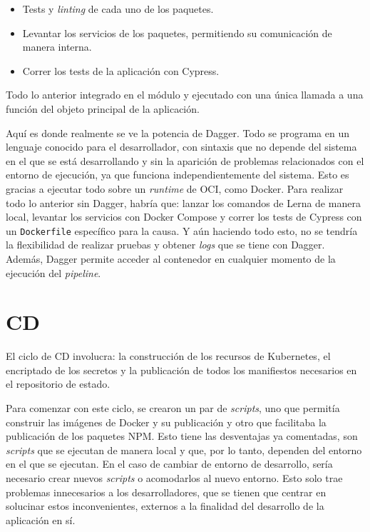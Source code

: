 \begin{itemize}
  \item Tests y \textit{linting} de cada uno de los paquetes.
  \item Levantar los servicios de los paquetes, permitiendo su comunicación de manera interna.
  \item Correr los tests de la aplicación con Cypress.
\end{itemize}

Todo lo anterior integrado en el módulo y ejecutado con una única llamada a una función del objeto principal de la aplicación.

Aquí es donde realmente se ve la potencia de Dagger. Todo se programa en un lenguaje conocido para el desarrollador, con sintaxis que no depende del sistema en el que se está desarrollando y sin la aparición de problemas relacionados con el entorno de ejecución, ya que funciona independientemente del sistema. Esto es gracias a ejecutar todo sobre un \textit{runtime} de OCI, como Docker. Para realizar todo lo anterior sin Dagger, habría que: lanzar los comandos de Lerna de manera local, levantar los servicios con Docker Compose y correr los tests de Cypress con un \texttt{Dockerfile} específico para la causa. Y aún haciendo todo esto, no se tendría la flexibilidad de realizar pruebas y obtener \textit{logs} que se tiene con Dagger. Además, Dagger permite acceder al contenedor en cualquier momento de la ejecución del \textit{pipeline}.

\section{CD}
\label{sec:cd}

El ciclo de CD involucra: la construcción de los recursos de Kubernetes, el encriptado de los secretos y la publicación de todos los manifiestos necesarios en el repositorio de estado.

Para comenzar con este ciclo, se crearon un par de \textit{scripts}, uno que permitía construir las imágenes de Docker y su publicación y otro que facilitaba la publicación de los paquetes NPM. Esto tiene las desventajas ya comentadas, son \textit{scripts} que se ejecutan de manera local y que, por lo tanto, dependen del entorno en el que se ejecutan. En el caso de cambiar de entorno de desarrollo, sería necesario crear nuevos \textit{scripts} o acomodarlos al nuevo entorno. Esto solo trae problemas innecesarios a los desarrolladores, que se tienen que centrar en solucinar estos inconvenientes, externos a la finalidad del desarrollo de la aplicación en sí.

